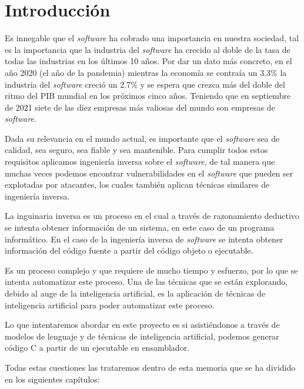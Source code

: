 \chapter{Introducción}
\label{cap:introducion}

\setcounter{page}{1}


Es innegable que el \textit{software} ha cobrado una importancia en nuestra sociedad, tal es
la importancia que la industria del \textit{software} ha crecido al doble de la tasa de todas
las industrias en los últimos 10 años. Por dar un dato más concreto, en el año 2020
(el año de la pandemia) mientras la economía se contraía un 3.3\% la industria del
\textit{software} creció un 2.7\% y se espera que crezca más del doble del ritmo del PIB
mundial en los próximos cinco años. Teniendo que en septiembre de 2021 siete de las
diez empresas más valiosas del mundo son empresas de \textit{software}. \cite{IndustriaSoftware}

Dada su relevancia en el mundo actual, es importante que el \textit{software} sea de calidad,
sea seguro, sea fiable y sea mantenible. Para cumplir todos estos requisitos aplicamos ingeniería
inversa sobre el \textit{software}, de tal manera que muchas veces podemos encontrar vulnerabilidades
en el \textit{software} que pueden ser explotadas por atacantes, los cuales también aplican técnicas
similares de ingeniería inversa.

La inguinaria inversa es un proceso en el cual a través de razonamiento deductivo se intenta
obtener información de un sistema, en este caso de un programa informático. En el caso de
la ingeniería inversa de \textit{software} se intenta obtener información del código fuente
a partir del código objeto o ejecutable.

Es un proceso complejo y que requiere de mucho tiempo y esfuerzo, por lo que se intenta
automatizar este proceso. Una de las técnicas que se están explorando, debido al auge
de la inteligencia artificial, es la aplicación de técnicas de inteligencia artificial
para poder automatizar este proceso.

Lo que intentaremos abordar en este proyecto es si asistiéndonos a través de modelos de lenguaje
y de técnicas de inteligencia artificial, podemos generar código C a partir de un ejecutable
en ensamblador.

Todas estas cuestiones las trataremos dentro de esta memoria que se ha dividido en los
siguientes capítulos:

